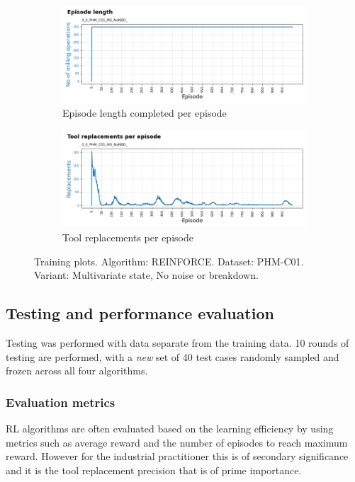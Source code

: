 \documentclass[a4paper, 12pt]{article}
\begin{document}
\begin{figure}[ht]
	\begin{subfigure}[b]{0.5\textwidth}
		\centering
		\includegraphics[width=\textwidth]{images/TrainingPlots/0_0_PHM_C01_MS_NoNBD__Episode_Length.png}  
		\caption{Episode length completed per episode}
		\label{fig:C01eplen}
	\end{subfigure}
	\hfill
	\begin{subfigure}[b]{0.5\textwidth}
		\centering
		\includegraphics[width=\textwidth]{images/TrainingPlots/0_0_PHM_C01_MS_NoNBD__Tool_Replacements.png}  
		\caption{Tool replacements per episode}
		\label{fig:C01toolrep}
	\end{subfigure} 
	\caption{Training plots. Algorithm: REINFORCE. Dataset: PHM-C01. Variant: Multivariate state, No noise or breakdown.}
	\label{fig:C01trplots}
\end{figure}

\subsection{Testing and performance evaluation}
Testing was performed with data separate from the training data. 10 rounds of testing are performed, with a \textit{new} set of 40 test cases randomly sampled and frozen across all four algorithms. 

\subsubsection*{Evaluation metrics}
RL algorithms are often evaluated based on the learning efficiency by using metrics such as average reward and the number of episodes to reach maximum reward. However for the industrial practitioner this is of secondary significance and it is the tool replacement precision that is of prime importance. 
\end{document}
